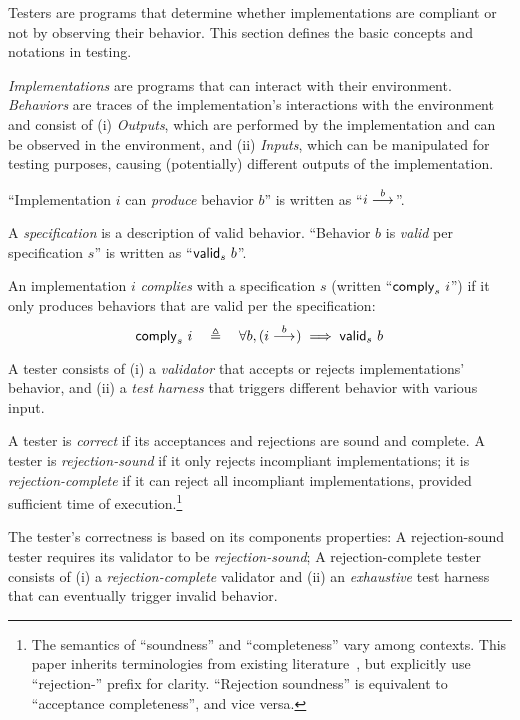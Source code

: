 Testers are programs that determine whether implementations are compliant or not
by observing their behavior.  This section defines the basic concepts and
notations in testing.

\begin{definition}
  {\em Implementations} are programs that can interact with their environment.
  {\em Behaviors} are traces of the implementation's interactions with the
  environment and consist of (i) {\em Outputs}, which are performed by the
  implementation and can be observed in the environment, and (ii) {\em Inputs},
  which can be manipulated for testing purposes, causing (potentially) different
  outputs of the implementation.

  ``Implementation $i$ can {\em produce} behavior $b$'' is written as
  ``$i\overset{b}\longrightarrow_{}$''.
\end{definition}

\begin{definition}
  A {\em specification} is a description of valid behavior.  ``Behavior $b$ is
  {\em valid} per specification $s$'' is written as ``$\mathsf{valid}_{s}~{b}$''.
  
  An implementation $i$ {\em complies} with a specification $s$ (written
  ``$\mathsf{comply}_{s}~{i}$'') if it only produces behaviors that are valid per the
  specification:
  \[\mathsf{comply}_{s}~{i}\quad\triangleq\quad\forall b,(i\overset{b}\longrightarrow_{})\implies\mathsf{valid}_{s}~{b}\]
\end{definition}

\begin{definition}
  A tester consists of (i) a {\em validator} that accepts or rejects
  implementations' behavior, and (ii) a {\em test harness} that triggers
  different behavior with various input.

  A tester is {\em correct} if its acceptances and rejections are sound and
  complete.  A tester is {\em rejection-sound} if it only rejects incompliant
  implementations; it is {\em rejection-complete} if it can reject all
  incompliant implementations, provided sufficient time of
  execution.\footnote{The semantics of ``soundness'' and ``completeness'' vary
    among contexts.  This paper inherits terminologies from existing
    literature~\cite{Tretmans}, but explicitly use ``rejection-'' prefix for
    clarity.  ``Rejection soundness'' is equivalent to ``acceptance
    completeness'', and vice versa.}

  The tester's correctness is based on its components properties: A
  rejection-sound tester requires its validator to be {\em rejection-sound}; A
  rejection-complete tester consists of (i) a {\em rejection-complete} validator
  and (ii) an {\em exhaustive} test harness that can eventually trigger invalid
  behavior.
\end{definition}

